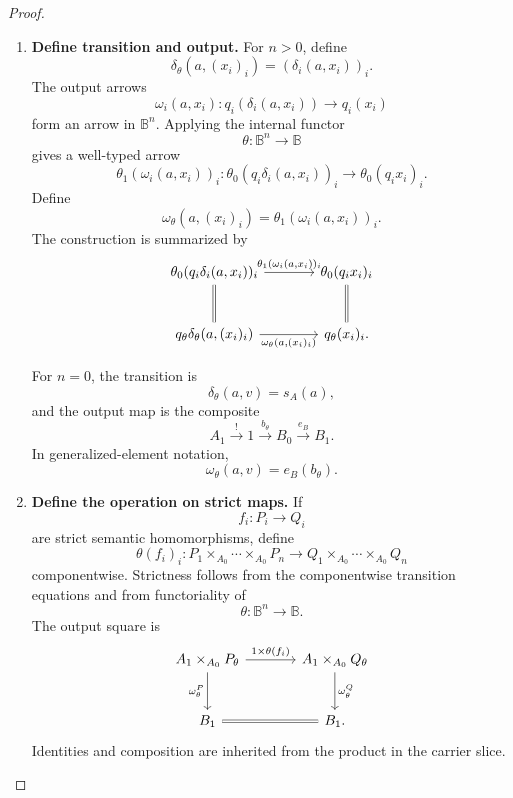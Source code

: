 \begin{proof}
\begin{enumerate}
        \item \textbf{Define transition and output.}
        For \(n>0\), define
        \[
            \delta_\theta(a,(x_i)_i)
            =
            (\delta_i(a,x_i))_i.
        \]
        The output arrows
        \[
            \omega_i(a,x_i):
            q_i(\delta_i(a,x_i))\to q_i(x_i)
        \]
        form an arrow in \(\mathbb B^n\). Applying the internal functor
        \[
            \theta:\mathbb B^n\to\mathbb B
        \]
        gives a well-typed arrow
        \[
            \theta_1(\omega_i(a,x_i))_i:
            \theta_0(q_i\delta_i(a,x_i))_i
            \to
            \theta_0(q_ix_i)_i.
        \]
        Define
        \[
            \omega_\theta(a,(x_i)_i)
            =
            \theta_1(\omega_i(a,x_i))_i.
        \]
        The construction is summarized by
        \[
        \begin{tikzcd}[column sep=large, row sep=large]
            \theta_0(q_i\delta_i(a,x_i))_i
                \arrow[r, "{\theta_1(\omega_i(a,x_i))_i}"]
                \arrow[d, equal]
            &
            \theta_0(q_ix_i)_i
                \arrow[d, equal]
            \\
            q_\theta\delta_\theta(a,(x_i)_i)
                \arrow[r, "{\omega_\theta(a,(x_i)_i)}"']
            &
            q_\theta(x_i)_i .
        \end{tikzcd}
        \]

        For \(n=0\), the transition is
        \[
            \delta_\theta(a,v)=s_A(a),
        \]
        and the output map is the composite
        \[
            A_1
            \xrightarrow{!}
            1
            \xrightarrow{b_\theta}
            B_0
            \xrightarrow{e_B}
            B_1.
        \]
        In generalized-element notation,
        \[
            \omega_\theta(a,v)=e_B(b_\theta).
        \]

        \item \textbf{Define the operation on strict maps.}
        If
        \[
            f_i:P_i\to Q_i
        \]
        are strict semantic homomorphisms, define
        \[
            \theta(f_i)_i:
            P_1\times_{A_0}\cdots\times_{A_0}P_n
            \to
            Q_1\times_{A_0}\cdots\times_{A_0}Q_n
        \]
        componentwise. Strictness follows from the componentwise transition
        equations and from functoriality of
        \[
            \theta:\mathbb B^n\to\mathbb B.
        \]
        The output square is
        \[
        \begin{tikzcd}[column sep=large, row sep=large]
            A_1\times_{A_0}P_\theta
                \arrow[r, "{1\times\theta(f_i)}"]
                \arrow[d, "\omega_\theta^P"']
            &
            A_1\times_{A_0}Q_\theta
                \arrow[d, "\omega_\theta^Q"]
            \\
            B_1
                \arrow[r, equal]
            &
            B_1 .
        \end{tikzcd}
        \]
        Identities and composition are inherited from the product in the
        carrier slice.


\end{enumerate}
\end{proof}
